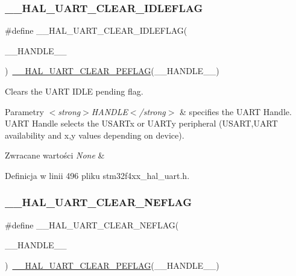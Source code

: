 \subsubsection{\texorpdfstring{\+\_\+\+\_\+\+H\+A\+L\+\_\+\+U\+A\+R\+T\+\_\+\+C\+L\+E\+A\+R\+\_\+\+I\+D\+L\+E\+F\+L\+AG}{\_\_HAL\_UART\_CLEAR\_IDLEFLAG}}
{\footnotesize\ttfamily \#define \+\_\+\+\_\+\+H\+A\+L\+\_\+\+U\+A\+R\+T\+\_\+\+C\+L\+E\+A\+R\+\_\+\+I\+D\+L\+E\+F\+L\+AG(\begin{DoxyParamCaption}\item[{}]{\+\_\+\+\_\+\+H\+A\+N\+D\+L\+E\+\_\+\+\_\+ }\end{DoxyParamCaption})~\hyperlink{group___u_a_r_t___exported___macros_gaba5e19c60e0f37341b1585a380b84d49}{\+\_\+\+\_\+\+H\+A\+L\+\_\+\+U\+A\+R\+T\+\_\+\+C\+L\+E\+A\+R\+\_\+\+P\+E\+F\+L\+AG}(\+\_\+\+\_\+\+H\+A\+N\+D\+L\+E\+\_\+\+\_\+)}



Clears the U\+A\+RT I\+D\+LE pending flag. 


\begin{DoxyParams}{Parametry}
{\em $<$strong$>$\+H\+A\+N\+D\+L\+E$<$/strong$>$} & specifies the U\+A\+RT Handle. U\+A\+RT Handle selects the U\+S\+A\+R\+Tx or U\+A\+R\+Ty peripheral (U\+S\+A\+RT,U\+A\+RT availability and x,y values depending on device). \\
\hline
\end{DoxyParams}

\begin{DoxyRetVals}{Zwracane wartości}
{\em None} & \\
\hline
\end{DoxyRetVals}


Definicja w linii 496 pliku stm32f4xx\+\_\+hal\+\_\+uart.\+h.

\mbox{\label{group___u_a_r_t___exported___macros_gaa1f69421585b3ada4d2b81d502a3ae6b}} 
\subsubsection{\texorpdfstring{\+\_\+\+\_\+\+H\+A\+L\+\_\+\+U\+A\+R\+T\+\_\+\+C\+L\+E\+A\+R\+\_\+\+N\+E\+F\+L\+AG}{\_\_HAL\_UART\_CLEAR\_NEFLAG}}
{\footnotesize\ttfamily \#define \+\_\+\+\_\+\+H\+A\+L\+\_\+\+U\+A\+R\+T\+\_\+\+C\+L\+E\+A\+R\+\_\+\+N\+E\+F\+L\+AG(\begin{DoxyParamCaption}\item[{}]{\+\_\+\+\_\+\+H\+A\+N\+D\+L\+E\+\_\+\+\_\+ }\end{DoxyParamCaption})~\hyperlink{group___u_a_r_t___exported___macros_gaba5e19c60e0f37341b1585a380b84d49}{\+\_\+\+\_\+\+H\+A\+L\+\_\+\+U\+A\+R\+T\+\_\+\+C\+L\+E\+A\+R\+\_\+\+P\+E\+F\+L\+AG}(\+\_\+\+\_\+\+H\+A\+N\+D\+L\+E\+\_\+\+\_\+)}




